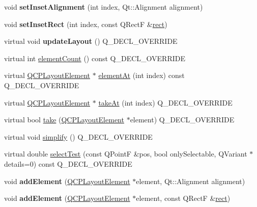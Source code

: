 \begin{DoxyCompactItemize}
void {\bfseries set\+Inset\+Alignment} (int index, Qt\+::\+Alignment alignment)
\item 
\mbox{\label{class_q_c_p_layout_inset_aa487c8378a6f9533567a2e6430099dc3}} 
void {\bfseries set\+Inset\+Rect} (int index, const Q\+RectF \&\hyperlink{class_q_c_p_layout_element_a208effccfe2cca4a0eaf9393e60f2dd4}{rect})
\item 
\mbox{\label{class_q_c_p_layout_inset_a7da0d1a31d6c7d4e4933f72a8caffc7d}} 
virtual void {\bfseries update\+Layout} () Q\+\_\+\+D\+E\+C\+L\+\_\+\+O\+V\+E\+R\+R\+I\+DE
\item 
virtual int \hyperlink{class_q_c_p_layout_inset_a4096aa1dc77ff54fc76df8e30b6d9e1b}{element\+Count} () const Q\+\_\+\+D\+E\+C\+L\+\_\+\+O\+V\+E\+R\+R\+I\+DE
\item 
virtual \hyperlink{class_q_c_p_layout_element}{Q\+C\+P\+Layout\+Element} $\ast$ \hyperlink{class_q_c_p_layout_inset_a747a1c6f09d24e34b9179ecad2658066}{element\+At} (int index) const Q\+\_\+\+D\+E\+C\+L\+\_\+\+O\+V\+E\+R\+R\+I\+DE
\item 
virtual \hyperlink{class_q_c_p_layout_element}{Q\+C\+P\+Layout\+Element} $\ast$ \hyperlink{class_q_c_p_layout_inset_ac95e930d304c7f07d9948f35172a396a}{take\+At} (int index) Q\+\_\+\+D\+E\+C\+L\+\_\+\+O\+V\+E\+R\+R\+I\+DE
\item 
virtual bool \hyperlink{class_q_c_p_layout_inset_a1daf9fe747380dcd3cf8ef9deb470dc9}{take} (\hyperlink{class_q_c_p_layout_element}{Q\+C\+P\+Layout\+Element} $\ast$element) Q\+\_\+\+D\+E\+C\+L\+\_\+\+O\+V\+E\+R\+R\+I\+DE
\item 
virtual void \hyperlink{class_q_c_p_layout_inset_abdac9a04752751ea68c320016086a2e8}{simplify} () Q\+\_\+\+D\+E\+C\+L\+\_\+\+O\+V\+E\+R\+R\+I\+DE
\item 
virtual double \hyperlink{class_q_c_p_layout_inset_a4bd96dd77545a2b407d24c8bdc276927}{select\+Test} (const Q\+PointF \&pos, bool only\+Selectable, Q\+Variant $\ast$details=0) const Q\+\_\+\+D\+E\+C\+L\+\_\+\+O\+V\+E\+R\+R\+I\+DE
\item 
\mbox{\label{class_q_c_p_layout_inset_ad61529eb576af7f04dff94abb10c745a}} 
void {\bfseries add\+Element} (\hyperlink{class_q_c_p_layout_element}{Q\+C\+P\+Layout\+Element} $\ast$element, Qt\+::\+Alignment alignment)
\item 
\mbox{\label{class_q_c_p_layout_inset_a8ff61fbee4a1f0ff45c398009d9f1e56}} 
void {\bfseries add\+Element} (\hyperlink{class_q_c_p_layout_element}{Q\+C\+P\+Layout\+Element} $\ast$element, const Q\+RectF \&\hyperlink{class_q_c_p_layout_element_a208effccfe2cca4a0eaf9393e60f2dd4}{rect})
\end{DoxyCompactItemize}
